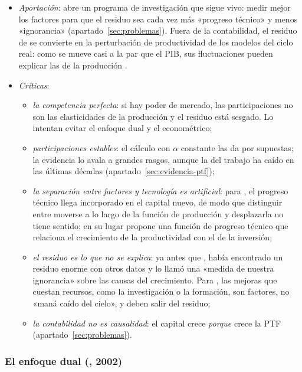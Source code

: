 \documentclass[11pt]{article}
\begin{document}
\begin{itemize}
\item \emph{Aportación}: abre un programa de investigación que sigue vivo: medir mejor los factores para que el residuo sea cada vez más «progreso técnico» y menos «ignorancia» (apartado~\ref{sec:problemas}). Fuera de la contabilidad, el residuo de  se convierte en la perturbación de productividad de los modelos del ciclo real: como se mueve casi a la par que el PIB, sus fluctuaciones pueden explicar las de la producción\nocite{KydlandPrescott1982Time,Prescott1986} .
\item \emph{Críticas}:
  \begin{itemize}
  \item \emph{la competencia perfecta}: si hay poder de mercado, las participaciones no son las elasticidades de la producción y el residuo está sesgado. Lo intentan evitar el enfoque dual y el econométrico;
  \item \emph{participaciones estables}: el cálculo con $\alpha$ constante las da por supuestas; la evidencia lo avala a grandes rasgos, aunque la del trabajo ha caído en las últimas décadas (apartado~\ref{sec:evidencia-ptf});
  \item \emph{la separación entre factores y tecnología es artificial}: para \textcite{Kaldor1957Model}, el progreso técnico llega incorporado en el capital nuevo, de modo que distinguir entre moverse a lo largo de la función de producción y desplazarla no tiene sentido; en su lugar propone una función de progreso técnico que relaciona el crecimiento de la productividad con el de la inversión;
  \item \emph{el residuo es lo que no se explica}: ya antes que , \textcite[p.~11]{Abramovitz1956} había encontrado un residuo enorme con otros datos y lo llamó una «medida de nuestra ignorancia» sobre las causas del crecimiento. Para \textcite{JorgensonGriliches1967}, las mejoras que cuestan recursos, como la investigación o la formación, son factores, no «maná caído del cielo», y deben salir del residuo;
  \item \emph{la contabilidad no es causalidad}: el capital crece \emph{porque} crece la PTF (apartado~\ref{sec:problemas}).
  \end{itemize}
\end{itemize}

\subsubsection{El enfoque dual (, 2002)}\label{sec:dual}
\end{document}
